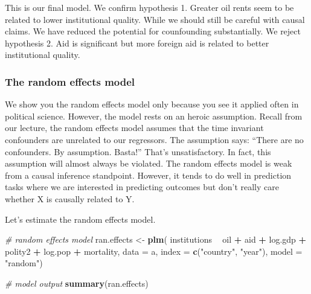\documentclass[]{article}
\newenvironment{Shaded}{\begin{snugshade}}{\end{snugshade}}
\newcommand{\KeywordTok}[1]{\textcolor[rgb]{0.13,0.29,0.53}{\textbf{#1}}}
\newcommand{\DataTypeTok}[1]{\textcolor[rgb]{0.13,0.29,0.53}{#1}}
\newcommand{\StringTok}[1]{\textcolor[rgb]{0.31,0.60,0.02}{#1}}
\newcommand{\CommentTok}[1]{\textcolor[rgb]{0.56,0.35,0.01}{\textit{#1}}}
\newcommand{\OperatorTok}[1]{\textcolor[rgb]{0.81,0.36,0.00}{\textbf{#1}}}
\newcommand{\NormalTok}[1]{#1}
\theoremstyle{definition}
\theoremstyle{definition}
\theoremstyle{definition}
\theoremstyle{remark}
\begin{document}
This is our final model. We confirm hypothesis 1. Greater oil rents seem
to be related to lower institutional quality. While we should still be
careful with causal claims. We have reduced the potential for
counfounding substantially. We reject hypothesis 2. Aid is significant
but more foreign aid is related to better institutional quality.

\subsubsection{The random effects model}\label{the-random-effects-model}

We show you the random effects model only because you see it applied
often in political science. However, the model rests on an heroic
assumption. Recall from our lecture, the random effects model assumes
that the time invariant confounders are unrelated to our regressors. The
assumption says: ``There are no confounders. By assumption. Basta!''
That's unsatisfactory. In fact, this assumption will almost always be
violated. The random effects model is weak from a causal inference
standpoint. However, it tends to do well in prediction tasks where we
are interested in predicting outcomes but don't really care whether X is
causally related to Y.

Let's estimate the random effects model.

\begin{Shaded}
\begin{Highlighting}[]
\CommentTok{# random effects model}
\NormalTok{ran.effects <-}\StringTok{ }\KeywordTok{plm}\NormalTok{(}
\NormalTok{  institutions }\OperatorTok{~}\StringTok{ }\NormalTok{oil }\OperatorTok{+}\StringTok{ }\NormalTok{aid }\OperatorTok{+}\StringTok{ }\NormalTok{log.gdp }\OperatorTok{+}\StringTok{ }\NormalTok{polity2 }\OperatorTok{+}\StringTok{ }\NormalTok{log.pop }\OperatorTok{+}\StringTok{ }\NormalTok{mortality,}
  \DataTypeTok{data =}\NormalTok{ a,}
  \DataTypeTok{index =} \KeywordTok{c}\NormalTok{(}\StringTok{"country"}\NormalTok{, }\StringTok{"year"}\NormalTok{),}
  \DataTypeTok{model =} \StringTok{"random"}\NormalTok{)}

\CommentTok{# model output}
\KeywordTok{summary}\NormalTok{(ran.effects)}
\end{Highlighting}
\end{Shaded}
\end{document}
